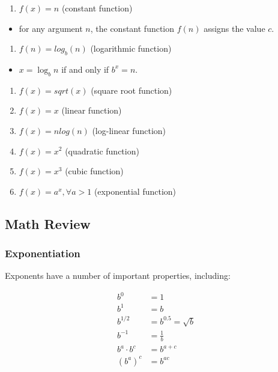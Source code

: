 \documentclass[11pt]{article}
\providecommand{\tightlist}{%
      \setlength{\itemsep}{0pt}\setlength{\parskip}{0pt}}
\begin{document}
\begin{enumerate}
\def\labelenumi{\arabic{enumi}.}
\tightlist
\item
  \(f(x) = n\) (constant function)
\end{enumerate}

\begin{itemize}
\tightlist
\item
  for any argument \(n\), the constant function \(f(n)\) assigns the
  value \(c\).
\end{itemize}

\begin{enumerate}
\def\labelenumi{\arabic{enumi}.}
\setcounter{enumi}{1}
\tightlist
\item
  \(f(n) = log_b(n)\) (logarithmic function)
\end{enumerate}

\begin{itemize}
\tightlist
\item
  \(x=\log_bn\) if and only if \(b^x = n\).
\end{itemize}

\begin{enumerate}
\def\labelenumi{\arabic{enumi}.}
\setcounter{enumi}{2}
\tightlist
\item
  \(f(x) = sqrt(x)\) (square root function)
\item
  \(f(x) = x\) (linear function)
\item
  \(f(x) = nlog(n)\) (log-linear function)
\item
  \(f(x) = x^2\) (quadratic function)
\item
  \(f(x) = x^3\) (cubic function)
\item
  \(f(x) = a^x, \forall a > 1\) (exponential function)
\end{enumerate}

    \hypertarget{math-review}{%
\subsection{Math Review}\label{math-review}}

    \hypertarget{exponentiation}{%
\subsubsection{Exponentiation}\label{exponentiation}}

Exponents have a number of important properties, including:

\begin{align}
        b^0 &= 1 \\
        b^1 &= b \\
        b^{1/2} &= b^{0.5} = \sqrt{b} \\
        b^{-1} &= \frac{1}{b} \\
        b^a \cdot b^c &= b^{a + c} \\
        (b^a)^c &= b^{ac}
    \end{align}
\end{document}
